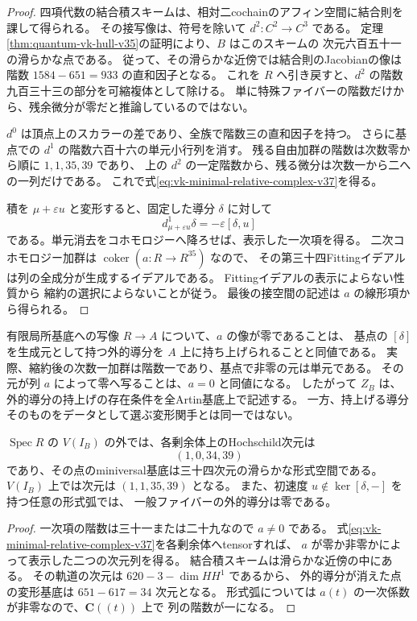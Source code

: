 \begin{proof}
四項代数の結合積スキームは、相対二cochainのアフィン空間に結合則を課して得られる。
その接写像は、符号を除いて $d^2:C^2\to C^3$ である。
定理\ref{thm:quantum-vk-hull-v35}の証明により、$B$ はこのスキームの
次元六百五十一の滑らかな点である。
従って、その滑らかな近傍では結合則のJacobianの像は階数
$1584-651=933$ の直和因子となる。
これを $R$ へ引き戻すと、$d^2$ の階数九百三十三の部分を可縮複体として除ける。
単に特殊ファイバーの階数だけから、残余微分が零だと推論しているのではない。

$d^0$ は頂点上のスカラーの差であり、全族で階数三の直和因子を持つ。
さらに基点での $d^1$ の階数六百十六の単元小行列を消す。
残る自由加群の階数は次数零から順に $1,1,35,39$ であり、
上の $d^2$ の一定階数から、残る微分は次数一から二への一列だけである。
これで式\eqref{eq:vk-minimal-relative-complex-v37}を得る。

積を $\mu+\varepsilon u$ と変形すると、固定した導分 $\delta$ に対して
\[
 d^1_{\mu+\varepsilon u}\delta
 =-\varepsilon[\delta,u]
\]
である。単元消去をコホモロジーへ降ろせば、表示した一次項を得る。
二次コホモロジー加群は $\operatorname{coker}(a:R\to R^{35})$ なので、
その第三十四Fittingイデアルは列の全成分が生成するイデアルである。
Fittingイデアルの表示によらない性質\cite[Tags 07Z8, 07ZA]{StacksFitting37}から
縮約の選択によらないことが従う。
最後の接空間の記述は $a$ の線形項から得られる。
\end{proof}

有限局所基底への写像 $R\to A$ について、$a$ の像が零であることは、
基点の $[\delta]$ を生成元として持つ外的導分を $A$ 上に持ち上げられることと同値である。
実際、縮約後の次数一加群は階数一であり、基点で非零の元は単元である。
その元が列 $a$ によって零へ写ることは、$a=0$ と同値になる。
したがって $Z_B$ は、外的導分の持上げの存在条件を全Artin基底上で記述する。
一方、持上げる導分そのものをデータとして選ぶ変形関手とは同一ではない。

\begin{corollary}[一般変形のHochschild群]
\label{cor:vk-generic-symmetry-breaking-v37}
$\operatorname{Spec}R$ の $V(I_B)$ の外では、各剰余体上のHochschild次元は
\[
 (1,0,34,39)
\]
であり、その点のminiversal基底は三十四次元の滑らかな形式空間である。
$V(I_B)$ 上では次元は $(1,1,35,39)$ となる。
また、初速度 $u\notin\ker[\delta,-]$ を持つ任意の形式弧では、
一般ファイバーの外的導分は零である。
\end{corollary}

\begin{proof}
一次項の階数は三十一または二十九なので $a\ne0$ である。
式\eqref{eq:vk-minimal-relative-complex-v37}を各剰余体へtensorすれば、
$a$ が零か非零かによって表示した二つの次元列を得る。
結合積スキームは滑らかな近傍の中にある。
その軌道の次元は $620-3-\dim HH^1$ であるから、
外的導分が消えた点の変形基底は $651-617=34$ 次元となる。
形式弧については $a(t)$ の一次係数が非零なので、$\mathbf C((t))$ 上で
列の階数が一になる。
\end{proof}

